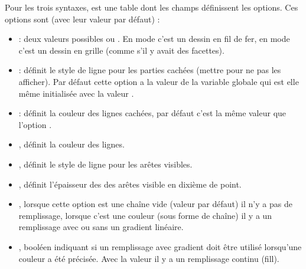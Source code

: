 Pour les trois syntaxes,  est une table dont les champs définissent les options. Ces options sont (avec leur valeur par défaut) :
\begin{itemize}
    \item {} : deux valeurs possibles  ou . En mode  c'est un dessin en fil de fer, en mode  c'est un dessin en grille (comme s'il y avait des facettes).
    
    \item {} : définit le style de ligne pour les parties cachées (mettre  pour ne pas les afficher). Par défaut cette option a la valeur de la variable globale  qui est elle même initialisée avec la valeur .
    
    \item {}: définit la couleur des lignes cachées, par défaut c'est la même valeur que l'option .
    
    \item {}, définit la couleur des lignes.
    
    \item {}, définit le style de ligne pour les arêtes visibles.

    \item {}, définit l'épaisseur des des arêtes visible en dixième de point.    
    
    \item {}, lorsque cette option est une chaîne vide (valeur par défaut) il n'y a pas de remplissage,  lorsque c'est une couleur (sous forme de chaîne) il y a un remplissage avec ou sans un gradient linéaire.
    
    \item {}, booléen indiquant si un remplissage avec gradient doit être utilisé lorsqu'une couleur a été précisée. Avec la valeur \false il y a un remplissage continu (fill).
      

\end{itemize}
